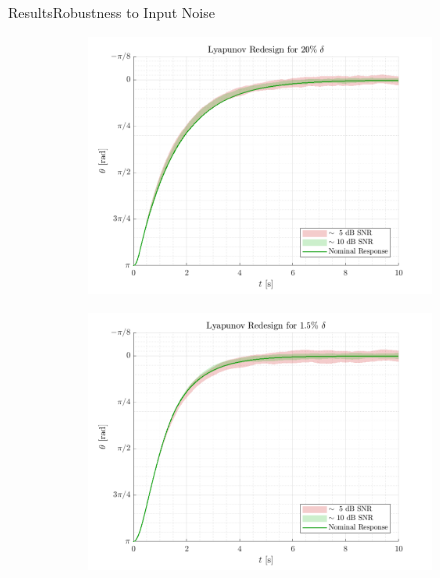 \begin{frame}{Results}{Robustness to Input Noise}
\begin{figure}[H]
  \begin{minipage}{0.45\linewidth}
    \begin{figure}[H]
      \centering
      \includegraphics[width=\linewidth]{figures/lyapunovRedesignInputNoise}
    \end{figure}        
  \end{minipage}\hfill      
  \begin{minipage}{0.45\linewidth}
    \begin{figure}[H]
      \centering
      \includegraphics[width=1\linewidth]{figures/lyapunovRedesign2InputNoise}
    \end{figure}                
  \end{minipage}\hfill \\
\end{figure}
\end{frame}
